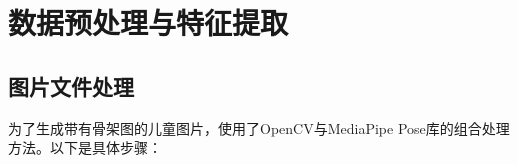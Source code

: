 


\newpage
\section{数据预处理与特征提取}

\subsection{图片文件处理}

为了生成带有骨架图的儿童图片，使用了OpenCV与MediaPipe Pose库的组合处理方法。以下是具体步骤：

